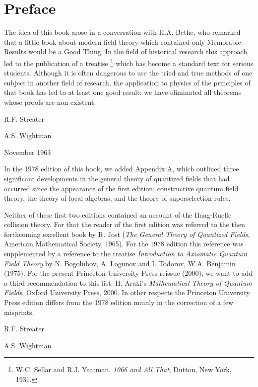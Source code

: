 \section*{Preface}

The idea of this book arose in a conversation with H.A. Bethe, who remarked that a little book about modern field theory which contained only Memorable Results would be a Good Thing. In the field of historical research this approach led to the publication of a treatise
\begingroup
\renewcommand{\thefootnote}{\ensuremath{\dagger}}%
\footnote{W.C. Sellar and R.J. Yeatman, \emph{1066 and All That}, Dutton, New York, 1931.}
\endgroup
which has become a standard text for serious students. Although it is often dangerous to use the tried and true methods of one subject in another field of research, the application to physics of the principles of that book has led to at least one good result: we have eliminated all theorems whose proofs are non-existent.

R.F. Streater\par
A.S. Wightman\par
November 1963

In the 1978 edition of this book, we added Appendix A, which outlined three significant developments in the general theory of quantized fields that had occurred since the appearance of the first edition: constructive quantum field theory, the theory of local algebras, and the theory of superselection rules.

Neither of these first two editions contained an account of the Haag-Ruelle collision theory. For that the reader of the first edition was referred to the then forthcoming excellent book by R. Jost (\emph{The General Theory of Quantized Fields}, American Mathematical Society, 1965). For the 1978 edition this reference was supplemented by a reference to the treatise \emph{Introduction to Axiomatic Quantum Field Theory} by N. Bogolubov, A. Logunov and I. Todorov, W.A. Benjamin (1975). For the present Princeton University Press reissue (2000), we want to add a
third recommendation to this list: H. Araki's \emph{Mathematical Theory of Quantum Fields}, Oxford University Press, 2000. In other respects the Princeton University Press edition differs from the 1978 edition mainly in the correction of a few misprints.

R.F. Streater\par
A.S. Wightman
